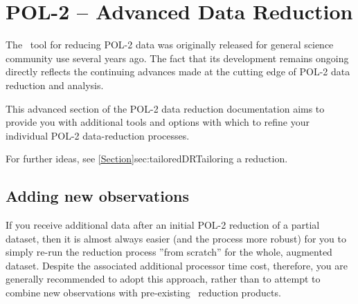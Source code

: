 \chapter{POL-2 -- Advanced Data Reduction}
\label{sec:advanced}

The \poltwomap\ tool for reducing POL-2 data was originally released for
general science community use several years ago. The fact that its
development remains ongoing directly reflects the continuing advances
made at the cutting edge of POL-2 data reduction and analysis.

This advanced section of the POL-2 data reduction documentation aims
to provide you with additional tools and options with which to refine
your individual POL-2 data-reduction processes.

For further ideas, see \cref{Section}{sec:tailoredDR}{Tailoring a reduction}.

\section{Adding new observations}

If you receive additional data after an initial POL-2 reduction of a partial dataset,
then it is almost always easier (and the process more robust) for you to simply
re-run the reduction process ''from scratch'' for the whole, augmented dataset.
Despite the associated additional processor time cost, therefore, you are generally
recommended to adopt this approach, rather than to attempt to combine new
observations with pre-existing \poltwomap\ reduction products.

